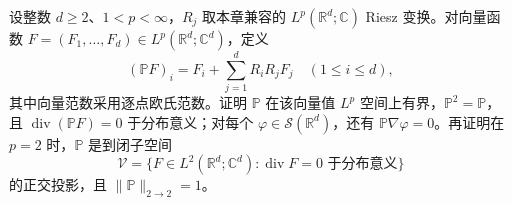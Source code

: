 \begin{exercise}\label{b2:ex:18-new-6}
设整数 \(d\geq2\)、\(1<p<\infty\)，\(R_j\) 取本章兼容的 \(L^p(\mathbb R^d;\mathbb C)\) Riesz 变换。对向量函数 \(F=(F_1,\ldots,F_d)\in L^p(\mathbb R^d;\mathbb C^d)\)，定义
\[
 (\mathbb PF)_i=F_i+\sum_{j=1}^dR_iR_jF_j
 \quad(1\leq i\leq d),
\]
其中向量范数采用逐点欧氏范数。证明 \(\mathbb P\) 在该向量值 \(L^p\) 空间上有界，\(\mathbb P^2=\mathbb P\)，且
\(\operatorname{div}(\mathbb PF)=0\) 于分布意义；对每个 \(\varphi\in\mathcal S(\mathbb R^d)\)，还有 \(\mathbb P\nabla\varphi=0\)。再证明在 \(p=2\) 时，\(\mathbb P\) 是到闭子空间
\[
 \mathcal V=\{F\in L^2(\mathbb R^d;\mathbb C^d):
                         \operatorname{div}F=0\text{ 于分布意义}\}
\]
的正交投影，且 \(\|\mathbb P\|_{2\to2}=1\)。
\end{exercise}
